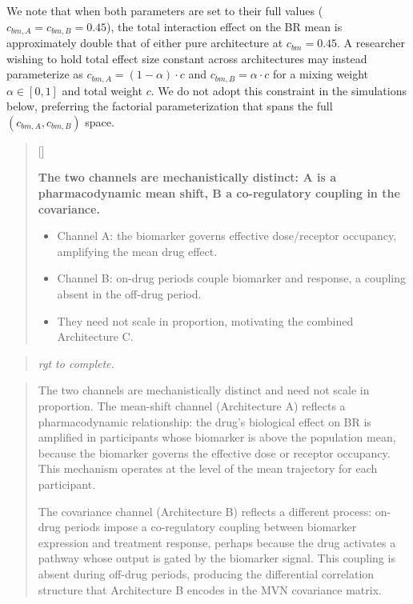 \documentclass[
  11pt,
]{article}
\newcounter{pgraph}
\newenvironment{bullets}{%
  \stepcounter{pgraph}%
  \begin{quote}\small\sffamily\color[gray]{0.30}%
  {\normalfont\scriptsize\color[gray]{0.58}[\thepgraph]\enspace}}{%
  \end{quote}}
\newenvironment{rgt}{%
  \begin{quote}\small\itshape\color[RGB]{20,60,160}}{%
  \end{quote}}
\newenvironment{orig}{%
  \begin{quote}\normalsize\color[gray]{0.55}}{%
  \end{quote}}
\begin{document}
We note that when both parameters are set to their full values
(\(c_{bm,A} = c_{bm,B} = 0.45\)), the total interaction effect on the BR
mean is approximately double that of either pure architecture at
\(c_{bm} = 0.45\). A researcher wishing to hold total effect size
constant across architectures may instead parameterize as
\(c_{bm,A} = (1-\alpha) \cdot c\) and \(c_{bm,B} = \alpha \cdot c\) for
a mixing weight \(\alpha \in [0,1]\) and total weight \(c\). We do not
adopt this constraint in the simulations below, preferring the factorial
parameterization that spans the full \((c_{bm,A}, c_{bm,B})\) space.

\begin{bullets}

\textbf{The two channels are mechanistically distinct: A is a
pharmacodynamic mean shift, B a co-regulatory coupling in the
covariance.}

\begin{itemize}\setlength{\itemsep}{2pt}\setlength{\parskip}{0pt}
\item Channel A: the biomarker governs effective dose/receptor
occupancy, amplifying the mean drug effect.
\item Channel B: on-drug periods couple biomarker and response, a
coupling absent in the off-drug period.
\item They need not scale in proportion, motivating the combined
Architecture C.
\end{itemize}

\end{bullets}

\begin{rgt}
rgt to complete.

\end{rgt}

\begin{orig}
The two channels are mechanistically distinct and need not scale in
proportion. The mean-shift channel (Architecture A) reflects a
pharmacodynamic relationship: the drug's biological effect on BR is
amplified in participants whose biomarker is above the population mean,
because the biomarker governs the effective dose or receptor occupancy.
This mechanism operates at the level of the mean trajectory for each
participant.

The covariance channel (Architecture B) reflects a different process:
on-drug periods impose a co-regulatory coupling between biomarker
expression and treatment response, perhaps because the drug activates a
pathway whose output is gated by the biomarker signal. This coupling is
absent during off-drug periods, producing the differential correlation
structure that Architecture B encodes in the MVN covariance matrix.

\end{orig}
\end{document}
